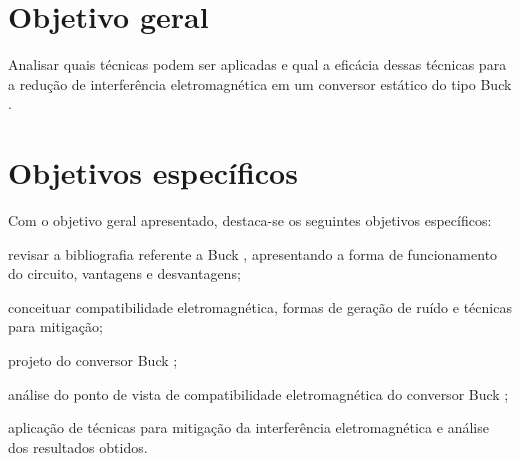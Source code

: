     \section{Objetivo geral}
    
        Analisar quais técnicas podem ser aplicadas e qual a eficácia dessas técnicas para a redução de interferência eletromagnética em um conversor estático do tipo Buck \interleaved.
    
    \section{Objetivos específicos}
    
        Com o objetivo geral apresentado, destaca-se os seguintes objetivos específicos: 
    
        \begin{alineas}
            
            \item revisar a bibliografia referente a Buck \interleaved, apresentando a forma de funcionamento do circuito, vantagens e desvantagens;
            
            \item conceituar compatibilidade eletromagnética, formas de geração de ruído e técnicas para mitigação;
            
            \item projeto do conversor Buck \interleaved;
            
            
            \item análise do ponto de vista de compatibilidade eletromagnética do conversor Buck \interleaved;
            
            \item aplicação de técnicas para mitigação da interferência eletromagnética e análise dos resultados obtidos.
            
        \end{alineas}
